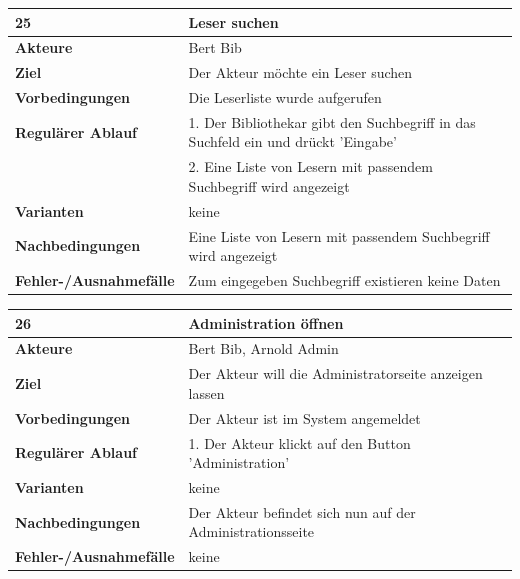 \documentclass[fontsize=12pt,paper=a4,twoside]{scrartcl}
\begin{document}
\begin{table}[htbp]
\label{25}
\begin{tabular}{|l|p{10cm}|}
\hline 
\textbf{25} & \textbf{Leser suchen} \\ \hline
\textbf{Akteure} & Bert Bib\\ \hline
\textbf{Ziel} & Der Akteur möchte ein Leser suchen \\ \hline
\textbf{Vorbedingungen} & Die Leserliste wurde aufgerufen \\ \hline
\textbf{Regulärer Ablauf} & 
1. Der Bibliothekar gibt den Suchbegriff in das Suchfeld ein und drückt 'Eingabe' \\
&2. Eine Liste von Lesern mit passendem Suchbegriff wird angezeigt\\
\hline
\textbf{Varianten} & 
keine \\ \hline
\textbf{Nachbedingungen} & Eine Liste von Lesern mit passendem Suchbegriff wird angezeigt\\ \hline
\textbf{Fehler-/Ausnahmefälle} & Zum eingegeben Suchbegriff existieren keine Daten\\
\hline
\end{tabular}
\end{table}

\begin{table}[htbp]
\label{26}
\begin{tabular}{|l|p{10cm}|}
\hline 
\textbf{26} & \textbf{Administration öffnen} \\ \hline
\textbf{Akteure} & Bert Bib, Arnold Admin\\ \hline
\textbf{Ziel} & Der Akteur will die Administratorseite anzeigen lassen \\ \hline
\textbf{Vorbedingungen} & Der Akteur ist im System angemeldet \\ \hline
\textbf{Regulärer Ablauf} & 
1. Der Akteur klickt auf den Button 'Administration' \\
\hline
\textbf{Varianten} & 
keine \\ \hline
\textbf{Nachbedingungen} & Der Akteur befindet sich nun auf der Administrationsseite\\ \hline
\textbf{Fehler-/Ausnahmefälle} & keine\\
\hline
\end{tabular}
\end{table}

\newpage
\end{document}
